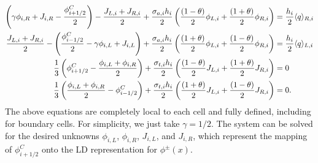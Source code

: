 \begin{align}\label{eq:update1}
    \left(\gamma\phi_{i,R} + J_{i,R} - \frac{\phi_{{i+1/2}}^C}{2} \right) - \frac{J_{L,i} + J_{R,i}}{2} + \frac{\sigma_{a,i} h_i}{2} \left(
    \frac{(1-\theta)}{2} \phi_{L,i} +
    \frac{(1+\theta)}{2}\phi_{R,i}\right) &= \frac{h_i}{2} \langle q \rangle_{R,i} \\
    \frac{J_{L,i} + J_{R,i}}{2} -\left(\frac{\phi_{i-1/2}^C}{2} - \gamma \phi_{i,L} +
    J_{i,L}\right) + \frac{\sigma_{a,i} h_i}{2} \left(
    \frac{(1+\theta)}{2} \phi_{L,i} +
    \frac{(1-\theta)}{2}\phi_{R,i}\right) &= \frac{h_i}{2} \langle q \rangle_{L,i} 
    \\
    \frac{1}{3}\left(\phi_{i+1/2}^C - \frac{\phi_{i,L} + \phi_{i,R}}{2}\right) +
    \frac{\sigma_{t,i} h_i}{2}\left( \frac{(1-\theta)}{2} J_{L,i} +
    \frac{(1+\theta)}{2}J_{R,i}\right)    &= 0 \\
    \frac{1}{3}\left(\frac{\phi_{i,L} + \phi_{i,R}}{2} - \phi^C_{i-1/2} \right) +
    \frac{\sigma_{t,i} h_i}{2} \left( \frac{(1+\theta)}{2} J_{L,i} +
    \frac{(1-\theta)}{2}J_{R,i}\right) &= 0 . \label{eq:update2}
\end{align}
The above equations are completely local to each cell and fully defined, including for
boundary cells. For simplicity, we just take $\gamma=1/2$.  The system can be solved for the desired unknowns
$\phi_{i,L}$, $\phi_{i,R}$, $J_{i,L}$, and $J_{i,R}$, which represent the mapping of
$\phi_{i+1/2}^C$ onto the LD representation for $\phi^{\pm}(x)$.


